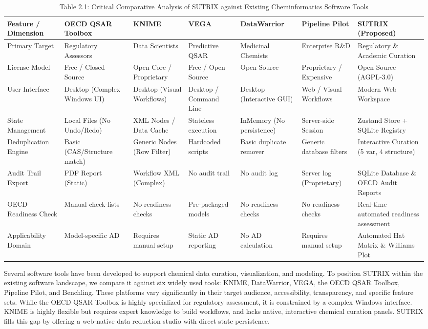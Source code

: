 \begin{table}[htbp]
  \centering
  \caption{Table 2.1: Critical Comparative Analysis of SUTRIX against Existing Cheminformatics Software Tools}
  \label{tab:table_2_prim}
  \begin{tabular}{lllllll}
    \toprule
    Feature / Dimension & OECD QSAR Toolbox & KNIME & VEGA & DataWarrior & Pipeline Pilot & SUTRIX (Proposed) \\
    \midrule
    Primary Target & Regulatory Assessors & Data Scientists & Predictive QSAR & Medicinal Chemists & Enterprise R\&D & Regulatory \& Academic Curation \\
    License Model & Free / Closed Source & Open Core / Proprietary & Free / Open Source & Open Source & Proprietary / Expensive & Open Source (AGPL-3.0) \\
    User Interface & Desktop (Complex Windows UI) & Desktop (Visual Workflows) & Desktop / Command Line & Desktop (Interactive GUI) & Web / Visual Workflows & Modern Web Workspace \\
    State Management & Local Files (No Undo/Redo) & XML Nodes / Data Cache & Stateless execution & InMemory (No persistence) & Server-side Session & Zustand Store + SQLite Registry \\
    Deduplication Engine & Basic (CAS/Structure match) & Generic Nodes (Row Filter) & Hardcoded scripts & Basic duplicate remover & Generic database filters & Interactive Curation (5 var, 4 structure) \\
    Audit Trail Export & PDF Report (Static) & Workflow XML (Complex) & No audit trail & No audit log & Server log (Proprietary) & SQLite Database \& OECD Audit Reports \\
    OECD Readiness Check & Manual check-lists & No readiness checks & Pre-packaged models & No readiness checks & No readiness checks & Real-time automated readiness assessment \\
    Applicability Domain & Model-specific AD & Requires manual setup & Static AD reporting & No AD calculation & Requires manual setup & Automated Hat Matrix \& Williams Plot \\
    \bottomrule
  \end{tabular}
\end{table}

Several software tools have been developed to support chemical data curation, visualization, and modeling. To position SUTRIX within the existing software landscape, we compare it against six widely used tools: KNIME, DataWarrior, VEGA, the OECD QSAR Toolbox, Pipeline Pilot, and Benchling. These platforms vary significantly in their target audience, accessibility, transparency, and specific feature sets. While the OECD QSAR Toolbox is highly specialized for regulatory assessment, it is constrained by a complex Windows interface. KNIME is highly flexible but requires expert knowledge to build workflows, and lacks native, interactive chemical curation panels. SUTRIX fills this gap by offering a web-native data reduction studio with direct state persistence.

